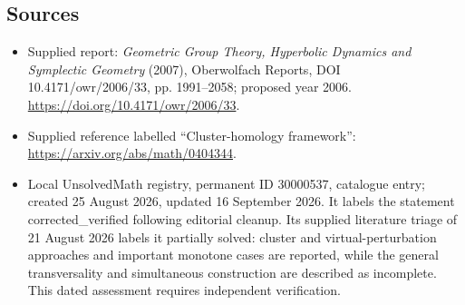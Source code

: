 \documentclass[11pt]{article}
\begin{document}
\subsection{Sources}
\begin{itemize}
\item Supplied report: \emph{Geometric Group Theory, Hyperbolic Dynamics and Symplectic Geometry} (2007), Oberwolfach Reports, DOI 10.4171/owr/2006/33, pp. 1991--2058; proposed year 2006. \url{https://doi.org/10.4171/owr/2006/33}.
\item Supplied reference labelled ``Cluster-homology framework'': \url{https://arxiv.org/abs/math/0404344}.
\item Local UnsolvedMath registry, permanent ID 30000537, catalogue entry; created 25 August 2026, updated 16 September 2026. It labels the statement corrected\_verified following editorial cleanup. Its supplied literature triage of 21 August 2026 labels it partially solved: cluster and virtual-perturbation approaches and important monotone cases are reported, while the general transversality and simultaneous construction are described as incomplete. This dated assessment requires independent verification.
\end{itemize}
\end{document}
